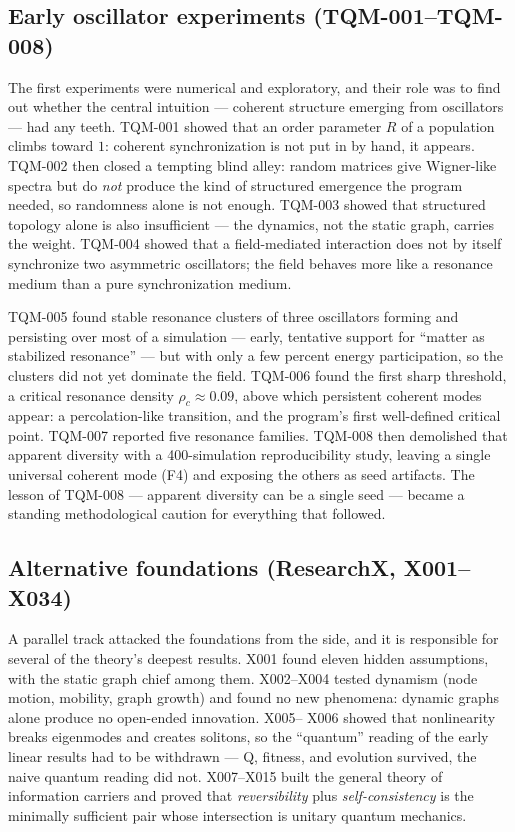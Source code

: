 \documentclass[10pt,twoside,openany]{book}
\begin{document}
\subsection{Early oscillator experiments (TQM-001--TQM-008)}

The first experiments were numerical and exploratory, and their role was to find out
whether the central intuition --- coherent structure emerging from oscillators --- had any
teeth. TQM-001 showed that an order parameter $R$ of a population climbs toward $1$:
coherent synchronization is not put in by hand, it appears. TQM-002 then closed a tempting
blind alley: random matrices give Wigner-like spectra but do \emph{not} produce the kind
of structured emergence the program needed, so randomness alone is not enough. TQM-003
showed that structured topology alone is also insufficient --- the dynamics, not the
static graph, carries the weight. TQM-004 showed that a field-mediated interaction does
not by itself synchronize two asymmetric oscillators; the field behaves more like a
resonance medium than a pure synchronization medium.

TQM-005 found stable resonance clusters of three oscillators forming and persisting over
most of a simulation --- early, tentative support for ``matter as stabilized resonance''
--- but with only a few percent energy participation, so the clusters did not yet dominate
the field. TQM-006 found the first sharp threshold, a critical resonance density
$\rho_c\approx0.09$, above which persistent coherent modes appear: a percolation-like
transition, and the program's first well-defined critical point. TQM-007 reported five
resonance families. TQM-008 then demolished that apparent diversity with a
400-simulation reproducibility study, leaving a single universal coherent mode (F4) and
exposing the others as seed artifacts. The lesson of TQM-008 --- apparent diversity can be
a single seed --- became a standing methodological caution for everything that followed.

\subsection{Alternative foundations (ResearchX, X001--X034)}

A parallel track attacked the foundations from the side, and it is responsible for several
of the theory's deepest results. X001 found eleven hidden assumptions, with the static
graph chief among them. X002--X004 tested dynamism (node motion, mobility, graph growth)
and found no new phenomena: dynamic graphs alone produce no open-ended innovation. X005--
X006 showed that nonlinearity breaks eigenmodes and creates solitons, so the ``quantum''
reading of the early linear results had to be withdrawn --- Q, fitness, and evolution
survived, the naive quantum reading did not. X007--X015 built the general theory of
information carriers and proved that \emph{reversibility} plus \emph{self-consistency} is
the minimally sufficient pair whose intersection is unitary quantum mechanics.
\end{document}
